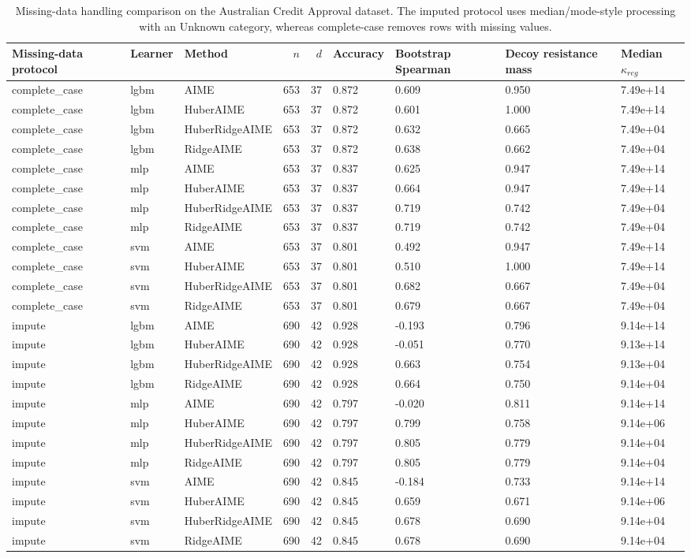 \begin{table}[t]
\centering
\begin{tabular}{lllrrllll}
\toprule
Missing-data protocol & Learner & Method & $n$ & $d$ & Accuracy & Bootstrap Spearman & Decoy resistance mass & Median $\kappa_{reg}$ \\
\midrule
complete_case & lgbm & AIME & 653 & 37 & 0.872 & 0.609 & 0.950 & 7.49e+14 \\
complete_case & lgbm & HuberAIME & 653 & 37 & 0.872 & 0.601 & 1.000 & 7.49e+14 \\
complete_case & lgbm & HuberRidgeAIME & 653 & 37 & 0.872 & 0.632 & 0.665 & 7.49e+04 \\
complete_case & lgbm & RidgeAIME & 653 & 37 & 0.872 & 0.638 & 0.662 & 7.49e+04 \\
complete_case & mlp & AIME & 653 & 37 & 0.837 & 0.625 & 0.947 & 7.49e+14 \\
complete_case & mlp & HuberAIME & 653 & 37 & 0.837 & 0.664 & 0.947 & 7.49e+14 \\
complete_case & mlp & HuberRidgeAIME & 653 & 37 & 0.837 & 0.719 & 0.742 & 7.49e+04 \\
complete_case & mlp & RidgeAIME & 653 & 37 & 0.837 & 0.719 & 0.742 & 7.49e+04 \\
complete_case & svm & AIME & 653 & 37 & 0.801 & 0.492 & 0.947 & 7.49e+14 \\
complete_case & svm & HuberAIME & 653 & 37 & 0.801 & 0.510 & 1.000 & 7.49e+14 \\
complete_case & svm & HuberRidgeAIME & 653 & 37 & 0.801 & 0.682 & 0.667 & 7.49e+04 \\
complete_case & svm & RidgeAIME & 653 & 37 & 0.801 & 0.679 & 0.667 & 7.49e+04 \\
impute & lgbm & AIME & 690 & 42 & 0.928 & -0.193 & 0.796 & 9.14e+14 \\
impute & lgbm & HuberAIME & 690 & 42 & 0.928 & -0.051 & 0.770 & 9.13e+14 \\
impute & lgbm & HuberRidgeAIME & 690 & 42 & 0.928 & 0.663 & 0.754 & 9.13e+04 \\
impute & lgbm & RidgeAIME & 690 & 42 & 0.928 & 0.664 & 0.750 & 9.14e+04 \\
impute & mlp & AIME & 690 & 42 & 0.797 & -0.020 & 0.811 & 9.14e+14 \\
impute & mlp & HuberAIME & 690 & 42 & 0.797 & 0.799 & 0.758 & 9.14e+06 \\
impute & mlp & HuberRidgeAIME & 690 & 42 & 0.797 & 0.805 & 0.779 & 9.14e+04 \\
impute & mlp & RidgeAIME & 690 & 42 & 0.797 & 0.805 & 0.779 & 9.14e+04 \\
impute & svm & AIME & 690 & 42 & 0.845 & -0.184 & 0.733 & 9.14e+14 \\
impute & svm & HuberAIME & 690 & 42 & 0.845 & 0.659 & 0.671 & 9.14e+06 \\
impute & svm & HuberRidgeAIME & 690 & 42 & 0.845 & 0.678 & 0.690 & 9.14e+04 \\
impute & svm & RidgeAIME & 690 & 42 & 0.845 & 0.678 & 0.690 & 9.14e+04 \\
\bottomrule
\end{tabular}

\caption{Missing-data handling comparison on the Australian Credit Approval dataset. The imputed protocol uses median/mode-style processing with an Unknown category, whereas complete-case removes rows with missing values.}
\label{tab:revision_missing_comparison}
\end{table}